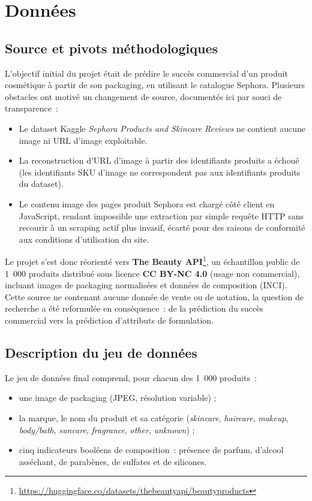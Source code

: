 \documentclass[11pt,a4paper]{article}
\begin{document}
\section{Données}

\subsection{Source et pivots méthodologiques}

L'objectif initial du projet était de prédire le succès commercial d'un produit cosmétique à partir de son packaging, en utilisant le catalogue Sephora. Plusieurs obstacles ont motivé un changement de source, documentés ici par souci de transparence~:

\begin{itemize}[leftmargin=1.5em]
  \item Le dataset Kaggle \emph{Sephora Products and Skincare Reviews} ne contient aucune image ni URL d'image exploitable.
  \item La reconstruction d'URL d'image à partir des identifiants produits a échoué (les identifiants SKU d'image ne correspondent pas aux identifiants produits du dataset).
  \item Le contenu image des pages produit Sephora est chargé côté client en JavaScript, rendant impossible une extraction par simple requête HTTP sans recourir à un scraping actif plus invasif, écarté pour des raisons de conformité aux conditions d'utilisation du site.
\end{itemize}

Le projet s'est donc réorienté vers \textbf{The Beauty API}\footnote{\url{https://huggingface.co/datasets/thebeautyapi/beautyproducts}}, un échantillon public de 1~000 produits distribué sous licence \textbf{CC BY-NC 4.0} (usage non commercial), incluant images de packaging normalisées et données de composition (INCI). Cette source ne contenant aucune donnée de vente ou de notation, la question de recherche a été reformulée en conséquence~: de la prédiction du succès commercial vers la prédiction d'attributs de formulation.

\subsection{Description du jeu de données}

Le jeu de données final comprend, pour chacun des 1~000 produits~:
\begin{itemize}[leftmargin=1.5em]
  \item une image de packaging (JPEG, résolution variable) ;
  \item la marque, le nom du produit et sa catégorie (\emph{skincare}, \emph{haircare}, \emph{makeup}, \emph{body/bath}, \emph{suncare}, \emph{fragrance}, \emph{other}, \emph{unknown}) ;
  \item cinq indicateurs booléens de composition~: présence de parfum, d'alcool asséchant, de parabènes, de sulfates et de silicones.
\end{itemize}
\end{document}
